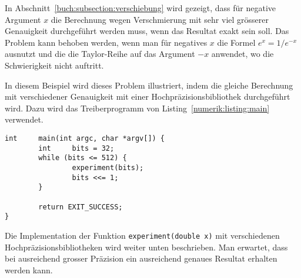 In Abschnitt~\ref{buch:subsection:verschiebung} wird gezeigt, dass
für negative Argument $x$ die Berechnung wegen Verschmierung mit sehr
viel grösserer Genauigkeit durchgeführt werden muss, wenn das Resultat
exakt sein soll.
%
Das Problem kann behoben werden, wenn man für negatives $x$
die Formel $e^x = 1/e^{-x}$ ausnutzt und die die Taylor-Reihe
auf das Argument $-x$ anwendet, wo die Schwierigkeit nicht auftritt.

In diesem Beispiel wird dieses Problem illustriert, indem die gleiche
Berechnung mit verschiedener Genauigkeit mit einer Hochpräzisionsbibliothek
durchgeführt wird.
%
Dazu wird das Treiberprogramm von Listing~\ref{numerik:listing:main}
verwendet.
%
\begin{lstlisting}[float,style=C,caption={Treiberprogramm zur Berechnung von $e^x$ mit verschiedenen Hochpräzisionsbibliotheken.},label={numerik:listing:main}]
int     main(int argc, char *argv[]) {
        int     bits = 32;
        while (bits <= 512) {
                experiment(bits);
                bits <<= 1;
        }

        return EXIT_SUCCESS;
}
\end{lstlisting}
Die Implementation der Funktion \texttt{experiment(double x)} mit 
verschiedenen Hochpräzisionsbibliotheken wird weiter unten beschrieben.
%
Man erwartet, dass bei ausreichend grosser Präzision ein ausreichend
genaues Resultat erhalten werden kann.
%

